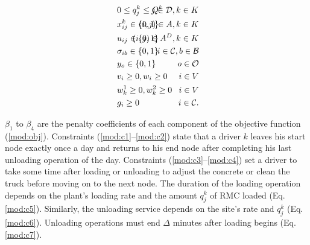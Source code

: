 \documentclass{article}
\begin{document}
\begin{alignat}{3}
    \label{mod:c32} &  0 \leq q^k_j \leq Q^k  & \hspace{-20mm}  j \in \mathcal{D}, k \in K \\
    \label{mod:c33} &  x^k_{ij} \in \{0,1\} & \hspace{-20mm}  (i,j) \in A , k \in K  \hspace{0mm} \\
    \label{mod:c34} &  u_{ij} \in \{0,1\} & \hspace{-20mm}  (i,j) \in A^D , k \in K  \hspace{0mm} \\
    \label{mod:c35} &  \sigma_{ib} \in \{0,1\} & \hspace{-20mm}  i \in \mathcal{C}, b \in \mathcal{B} \\
    \label{mod:c36} &  y_o \in \{0,1\} & \hspace{-20mm}  o \in \mathcal{O} \\
    \label{mod:c37} &  v_i \geq 0,  w_i \geq 0 & \hspace{-20mm}  i \in V \\\
    \label{mod:c38} &  w^1_{k} \geq 0,  w^2_k \geq 0  & \hspace{-20mm}  i \in V \\
    \label{mod:cend} &  g_i \geq 0   & \hspace{-20mm}  i \in \mathcal{C}.
\end{alignat}

$\beta_1$ to $\beta_4$ are the penalty coefficients of each component of the objective function (\ref{mod:obj}). Constraints (\ref{mod:c1}--\ref{mod:c2}) state that a driver $k$ leaves his start node exactly once a day and returns to his end node after completing his last unloading operation of the day. Constraints (\ref{mod:c3}--\ref{mod:c4}) set a driver to take some time after loading or unloading to adjust the concrete or clean the truck before moving on to the next node. The duration of the loading operation depends on the plant's loading rate and the amount $q^k_j$ of RMC loaded (Eq. \ref{mod:c5}). Similarly, the unloading service depends on the site's rate and $q^k_j$ (Eq. \ref{mod:c6}). Unloading operations must end $\Delta$ minutes after loading begins (Eq. \ref{mod:c7}). 
\end{document}
